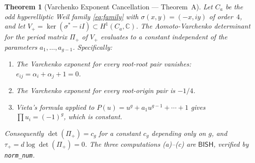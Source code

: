 \documentclass[11pt]{article}
\theoremstyle{plain}
\newtheorem{theorem}{Theorem}[section]
\theoremstyle{definition}
\theoremstyle{remark}
\newcommand{\CC}{\mathbb{C}}
\newcommand{\BISH}{\mathsf{BISH}}
\begin{document}
\begin{theorem}[Varchenko Exponent Cancellation --- Theorem~A]\label{thm:A}
  Let $C_a$ be the odd hyperelliptic Weil family \eqref{eq:family} with
  $\sigma(x,y) = (-x,iy)$ of order~$4$, and let $V_+ = \ker(\sigma^* - iI)
  \subset H^1(C_a,\CC)$.  The Aomoto-Varchenko determinant for the period
  matrix $\Pi_+$ of $V_+$ evaluates to a constant independent of the
  parameters $a_1,\ldots,a_{g-1}$.  Specifically:
  \begin{enumerate}[label=\textup{(\alph*)}]
    \item The Varchenko exponent for every root-root pair vanishes:
      $e_{ij} = \alpha_i + \alpha_j + 1 = 0$.
    \item The Varchenko exponent for every root-origin pair is $-1/4$.
    \item Vieta's formula applied to $P(u) = u^g + a_1u^{g-1} + \cdots + 1$
      gives $\prod u_i = (-1)^g$, which is constant.
  \end{enumerate}
  Consequently $\det(\Pi_+) = c_g$ for a constant $c_g$ depending only
  on $g$, and $\tau_+ = d\log\det(\Pi_+) = 0$.
  The three computations (a)--(c) are $\BISH$, verified by \texttt{norm\_num}.
\end{theorem}
\end{document}
